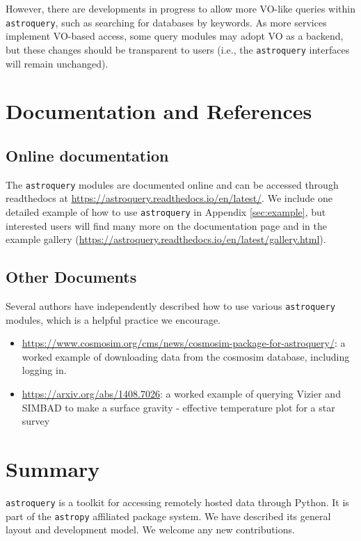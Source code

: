 \documentclass[twocolumn]{aastex61}
\newcommand{\package}[1]{\texttt{#1}\xspace}
\newcommand{\astroquery}{\package{astroquery}}
\newcommand{\astropypkg}{\package{astropy}}
\begin{document}
However, there are developments in progress to allow more VO-like queries
within \astroquery, such as searching for databases by keywords.  As more
services implement VO-based access, some query modules may adopt VO as a backend,
but these changes should be transparent to users (i.e., the \astroquery
interfaces will remain unchanged).

\section{Documentation and References}
\subsection{Online documentation}
The \astroquery modules are documented online and can be accessed through
readthedocs at \url{https://astroquery.readthedocs.io/en/latest/}.
We include one detailed example of how to use \astroquery in Appendix \ref{sec:example},
but interested users will find many more on the documentation page and
in the example gallery (\url{https://astroquery.readthedocs.io/en/latest/gallery.html}).

\subsection{Other Documents}
Several authors have independently described how to use various \astroquery
modules, which is a helpful practice we encourage.

\begin{itemize}
    \item
        \url{https://www.cosmosim.org/cms/news/cosmosim-package-for-astroquery/}:
        a worked example of downloading data from the cosmosim database,
        including logging in.
    \item \url{https://arxiv.org/abs/1408.7026}: a worked example of querying
        Vizier and SIMBAD to make a surface gravity - effective temperature
        plot for a star survey
\end{itemize}

\section{Summary}
\astroquery is a toolkit for accessing remotely hosted data through Python.
It is part of the \astropypkg affiliated package system.
We have described its general layout and development model.
We welcome any new contributions.
\end{document}
